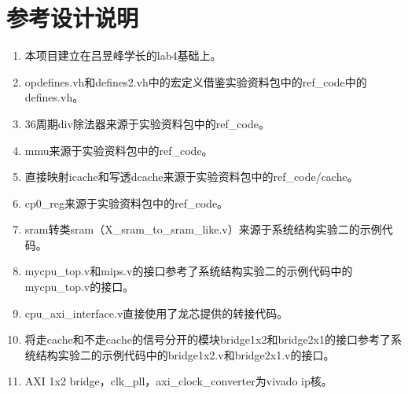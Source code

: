 \section{参考设计说明}

\begin{enumerate}
    \item 本项目建立在吕昱峰学长的lab4基础上\cite{lab4}。
    \item opdefines.vh和defines2.vh中的宏定义借鉴实验资料包中的ref\_code中的defines.vh。
    \item 36周期div除法器来源于实验资料包中的ref\_code\cite{实验资料包}。
    \item mmu来源于实验资料包中的ref\_code。
    \item 直接映射icache和写透dcache来源于实验资料包中的ref\_code/cache。
    \item cp0\_reg来源于实验资料包中的ref\_code。
    \item sram转类sram（X\_sram\_to\_sram\_like.v）来源于系统结构实验二的示例代码。
    \item mycpu\_top.v和mips.v的接口参考了系统结构实验二的示例代码中的mycpu\_top.v的接口。
    \item cpu\_axi\_interface.v直接使用了龙芯提供的转接代码。
    \item 将走cache和不走cache的信号分开的模块bridge1x2和bridge2x1的接口参考了系统结构实验二的示例代码中的bridge1x2.v和bridge2x1.v的接口。
    \item AXI 1x2 bridge，clk\_pll，axi\_clock\_converter为vivado ip核。
\end{enumerate}